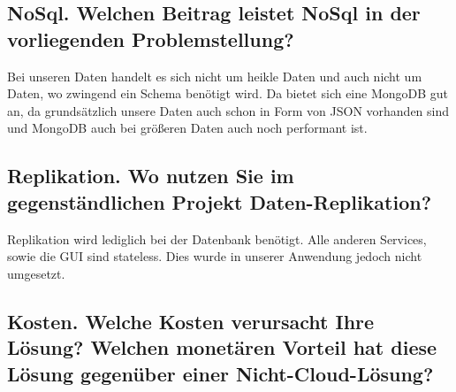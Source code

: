 \documentclass[11pt, a4paper]{article}   	%
\begin{document}
\subsection{NoSql. Welchen Beitrag leistet NoSql in der vorliegenden Problemstellung?}
Bei unseren Daten handelt es sich nicht um heikle Daten und auch nicht um Daten, wo zwingend ein Schema benötigt wird. Da bietet sich eine MongoDB gut an, da grundsätzlich unsere Daten auch schon in Form von JSON vorhanden sind und MongoDB auch bei größeren Daten auch noch performant ist. 

\subsection{Replikation. Wo nutzen Sie im gegenständlichen Projekt Daten-Replikation?}
Replikation wird lediglich bei der Datenbank benötigt. Alle anderen Services, sowie die GUI sind stateless. Dies wurde in unserer Anwendung jedoch nicht umgesetzt.

\subsection{Kosten. Welche Kosten verursacht Ihre Lösung? Welchen monetären Vorteil hat diese Lösung gegenüber einer Nicht-Cloud-Lösung?}
\end{document}
